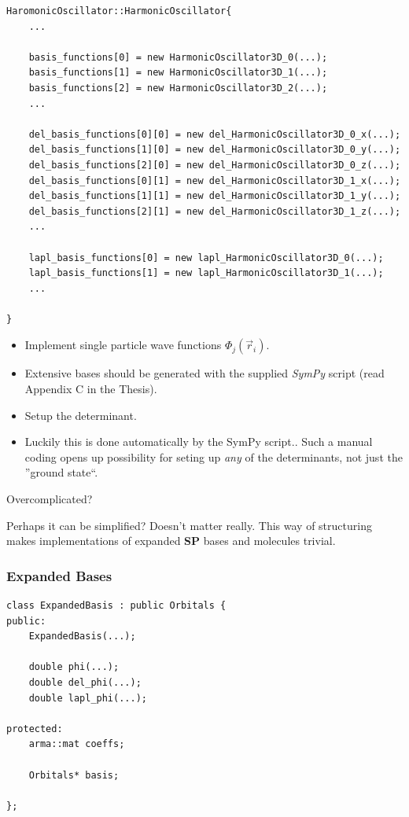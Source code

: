 \documentclass{beamer}
\begin{document}
\begin{frame}[containsverbatim]
\scriptsize
 \begin{verbatim}
HaromonicOscillator::HarmonicOscillator{
    ...

    basis_functions[0] = new HarmonicOscillator3D_0(...);
    basis_functions[1] = new HarmonicOscillator3D_1(...);
    basis_functions[2] = new HarmonicOscillator3D_2(...);
    ...

    del_basis_functions[0][0] = new del_HarmonicOscillator3D_0_x(...);
    del_basis_functions[1][0] = new del_HarmonicOscillator3D_0_y(...);
    del_basis_functions[2][0] = new del_HarmonicOscillator3D_0_z(...);
    del_basis_functions[0][1] = new del_HarmonicOscillator3D_1_x(...);
    del_basis_functions[1][1] = new del_HarmonicOscillator3D_1_y(...);
    del_basis_functions[2][1] = new del_HarmonicOscillator3D_1_z(...);
    ...

    lapl_basis_functions[0] = new lapl_HarmonicOscillator3D_0(...);
    lapl_basis_functions[1] = new lapl_HarmonicOscillator3D_1(...);
    ...
    
}
 \end{verbatim}
\normalsize
 
\end{frame}

\begin{frame}

 \begin{itemize}
    \item Implement single particle wave functions $\Phi_j(\vec r_i)$.
    \item Extensive bases should be generated with the supplied \textit{SymPy} script (read Appendix C in the Thesis).
    \item Setup the determinant.
    \item Luckily this is done automatically by the SymPy script.. Such a manual coding opens up possibility for seting up \textit{any} of the determinants, not just the ''ground state``.
\end{itemize}

\pause

Overcomplicated?

\pause 

Perhaps it can be simplified? Doesn't matter really. This way of structuring makes implementations of expanded \textbf{SP} bases and molecules trivial.

\end{frame}

\begin{frame}[containsverbatim]\frametitle{Expanded Bases}
\scriptsize
\begin{verbatim}
class ExpandedBasis : public Orbitals {
public:
    ExpandedBasis(...);

    double phi(...);
    double del_phi(...);
    double lapl_phi(...);
    
protected:
    arma::mat coeffs;

    Orbitals* basis;

};
\end{verbatim}
\normalsize
\end{frame}
\end{document}
